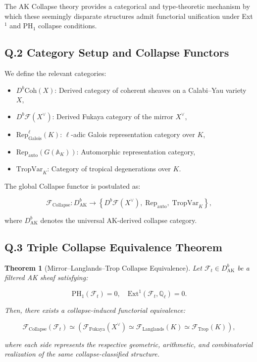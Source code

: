 \documentclass[11pt]{article}
\newtheorem{theorem}{Theorem}[section]
\begin{document}
The AK Collapse theory provides a categorical and type-theoretic mechanism by which these seemingly disparate structures admit functorial unification under Ext$^1$ and PH$_1$ collapse conditions.

\subsection*{Q.2 Category Setup and Collapse Functors}

We define the relevant categories:

\begin{itemize}
  \item $D^b\mathrm{Coh}(X)$: Derived category of coherent sheaves on a Calabi–Yau variety $X$,
  \item $D^b\mathcal{F}(X^\vee)$: Derived Fukaya category of the mirror $X^\vee$,
  \item $\mathrm{Rep}^\ell_{\mathrm{Galois}}(K)$: $\ell$-adic Galois representation category over $K$,
  \item $\mathrm{Rep}_{\mathrm{auto}}(G(\mathbb{A}_K))$: Automorphic representation category,
  \item $\mathrm{TropVar}_K$: Category of tropical degenerations over $K$.
\end{itemize}

The global Collapse functor is postulated as:

\[
\mathcal{F}_{\mathrm{Collapse}} :
D^b_{\mathrm{AK}} \longrightarrow
\left\{
D^b\mathcal{F}(X^\vee),\;
\mathrm{Rep}_{\mathrm{auto}},\;
\mathrm{TropVar}_K
\right\},
\]

where $D^b_{\mathrm{AK}}$ denotes the universal AK-derived collapse category.

\subsection*{Q.3 Triple Collapse Equivalence Theorem}

\begin{theorem}[Mirror–Langlands–Trop Collapse Equivalence]
Let $\mathcal{F}_t \in D^b_{\mathrm{AK}}$ be a filtered AK sheaf satisfying:

\[
\mathrm{PH}_1(\mathcal{F}_t) = 0, \quad \mathrm{Ext}^1(\mathcal{F}_t, \mathbb{Q}_\ell) = 0.
\]

Then, there exists a collapse-induced functorial equivalence:

\[
\mathcal{F}_{\mathrm{Collapse}}(\mathcal{F}_t) \simeq
\left(
\mathcal{F}_{\mathrm{Fukaya}}(X^\vee)
\simeq
\mathcal{F}_{\mathrm{Langlands}}(K)
\simeq
\mathcal{F}_{\mathrm{Trop}}(K)
\right),
\]

where each side represents the respective geometric, arithmetic, and combinatorial realization of the same collapse-classified structure.
\end{theorem}
\end{document}

